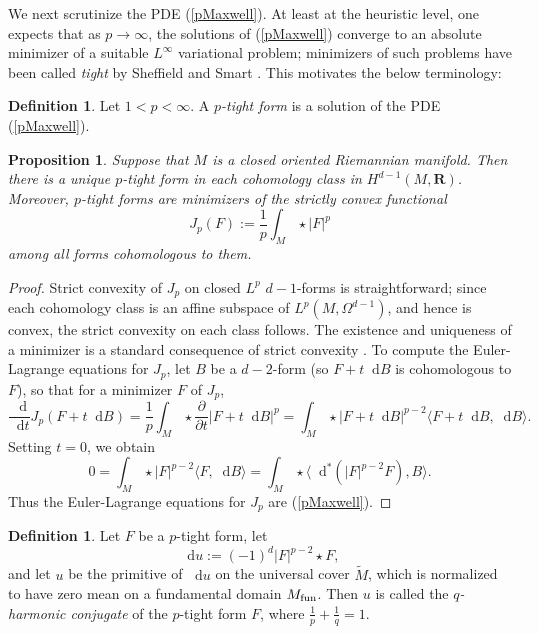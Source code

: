 \documentclass[reqno,11pt]{amsart}
\newcommand{\RR}{\mathbf{R}}
\newcommand*\dif{\mathop{}\!\mathrm{d}}
\newcommand{\dfn}[1]{\emph{#1}\index{#1}}
\newtheorem{proposition}[theorem]{Proposition}
\theoremstyle{definition}
\newtheorem{definition}[theorem]{Definition}
\numberwithin{equation}{section}
\begin{document}
We next scrutinize the PDE (\ref{pMaxwell}).
At least at the heuristic level, one expects that as $p \to \infty$, the solutions of (\ref{pMaxwell}) converge to an absolute minimizer of a suitable $L^\infty$ variational problem; minimizers of such problems have been called \dfn{tight} by Sheffield and Smart \cite{Sheffield12}.
This motivates the below terminology:

\begin{definition}
Let $1 < p < \infty$.
A \dfn{$p$-tight form} is a solution of the PDE (\ref{pMaxwell}).
\end{definition}

\begin{proposition}
Suppose that $M$ is a closed oriented Riemannian manifold.
Then there is a unique $p$-tight form in each cohomology class in $H^{d - 1}(M, \RR)$.
Moreover, $p$-tight forms are minimizers of the strictly convex functional
$$J_p(F) := \frac{1}{p} \int_M \star |F|^p$$
among all forms cohomologous to them.
\end{proposition}
\begin{proof}
Strict convexity of $J_p$ on closed $L^p$ $d - 1$-forms is straightforward; since each cohomology class is an affine subspace of $L^p(M, \Omega^{d - 1})$, and hence is convex, the strict convexity on each class follows.
The existence and uniqueness of a minimizer is a standard consequence of strict convexity \cite[Chapter II]{Ekeland99}.
To compute the Euler-Lagrange equations for $J_p$, let $B$ be a $d-2$-form (so $F + t \dif B$ is cohomologous to $F$), so that for a minimizer $F$ of $J_p$,
$$\frac{\dif}{\dif t} J_p(F + t \dif B) = \frac{1}{p} \int_M \star \frac{\partial}{\partial t} |F + t \dif B|^p = \int_M \star |F + t \dif B|^{p - 2} \langle F + t \dif B, \dif B\rangle.$$
Setting $t = 0$, we obtain 
$$0 = \int_M \star |F|^{p - 2} \langle F, \dif B\rangle = \int_M \star \langle \dif^*(|F|^{p - 2} F), B\rangle.$$
Thus the Euler-Lagrange equations for $J_p$ are (\ref{pMaxwell}).
\end{proof}

\begin{definition}
Let $F$ be a $p$-tight form, let
\begin{equation}
\dif u := (-1)^d |F|^{p - 2} \star F, \label{inverse extremality}
\end{equation}
and let $u$ be the primitive of $\dif u$ on the universal cover $\tilde M$, which is normalized to have zero mean on a fundamental domain $M_{\rm fun}$.
Then $u$ is called the \dfn{$q$-harmonic conjugate} of the $p$-tight form $F$, where $\frac{1}{p} + \frac{1}{q} = 1$.
\end{definition}
\end{document}
